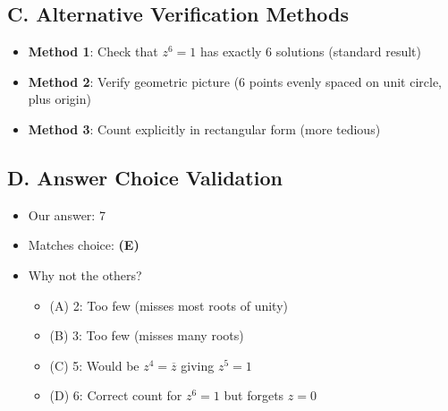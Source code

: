 \documentclass[11pt]{article}
\begin{document}
\begin{verificationbox}
\subsection*{C. Alternative Verification Methods}
\begin{itemize}[leftmargin=*]
    \item \textbf{Method 1}: Check that $z^6 = 1$ has exactly 6 solutions (standard result)
    \item \textbf{Method 2}: Verify geometric picture (6 points evenly spaced on unit circle, plus origin)
    \item \textbf{Method 3}: Count explicitly in rectangular form (more tedious)
\end{itemize}

\subsection*{D. Answer Choice Validation}
\begin{itemize}[leftmargin=*]
    \item Our answer: 7
    \item Matches choice: \textbf{(E)}
    \item Why not the others?
    \begin{itemize}
        \item (A) 2: Too few (misses most roots of unity)
        \item (B) 3: Too few (misses many roots)
        \item (C) 5: Would be $z^4 = \overline{z}$ giving $z^5 = 1$
        \item (D) 6: Correct count for $z^6 = 1$ but forgets $z = 0$
    \end{itemize}
\end{itemize}
\end{verificationbox}
\end{document}
